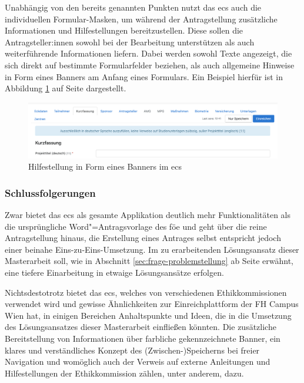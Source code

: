 \documentclass[a4paper,12pt,twoside]{scrreprt}
\begin{document}
\medskip

Unabhängig von den bereits genannten Punkten nutzt das \ac{ecs} auch die individuellen Formular-Masken, um während der Antragstellung zusätzliche Informationen und Hilfestellungen bereitzustellen. Diese sollen die Antragsteller:innen sowohl bei der Bearbeitung unterstützen als auch weiterführende Informationen liefern. Dabei werden sowohl Texte angezeigt, die sich direkt auf bestimmte Formularfelder beziehen, als auch allgemeine Hinweise in Form eines Banners am Anfang eines Formulars. Ein Beispiel hierfür ist in Abbildung \ref{fig:ecs-banner-hilfestellung} auf Seite \pageref{fig:ecs-banner-hilfestellung} dargestellt.

\begin{figure}[ht]
    \centering
    \includegraphics[width=\linewidth]{thesis/images/Luidold_ECS-Banner-Hilfestellung.png}
    \caption[Hilfestellung in Form eines Banners im \acl{ecs}]{Hilfestellung in Form eines Banners im \acl{ecs} \cite{ethikkommission_der_medizinischen_universitat_innsbruck_ethikkommission_2023}}
    \label{fig:ecs-banner-hilfestellung}
\end{figure}

\subsubsection*{Schlussfolgerungen}
\label{sub-sub-sec:schlussfolgerungen-ecs}

Zwar bietet das \acl{ecs} als gesamte Applikation deutlich mehr Funktionalitäten als die ursprüngliche Word"=Antragsvorlage des \ac{föe} und geht über die reine Antragstellung hinaus, die Erstellung eines Antrages selbst entspricht jedoch einer beinahe Eins-zu-Eins-Umsetzung. Im zu erarbeitenden Lösungsansatz dieser Masterarbeit soll, wie in Abschnitt \ref{sec:frage-problemstellung} ab Seite \pageref{sec:frage-problemstellung} erwähnt, eine tiefere Einarbeitung in etwaige Lösungsansätze erfolgen.

Nichtsdestotrotz bietet das \ac{ecs}, welches von verschiedenen Ethikkommissionen verwendet wird und gewisse Ähnlichkeiten zur Einreichplattform der FH Campus Wien hat, in einigen Bereichen Anhaltspunkte und Ideen, die in die Umsetzung des Lösungsansatzes dieser Masterarbeit einfließen könnten. Die zusätzliche Bereitstellung von Informationen über farbliche gekennzeichnete Banner, ein klares und verständliches Konzept des (Zwischen-)Speicherns bei freier Navigation und womöglich auch der Verweis auf externe Anleitungen und Hilfestellungen der Ethikkommission zählen, unter anderem, dazu.
\end{document}
